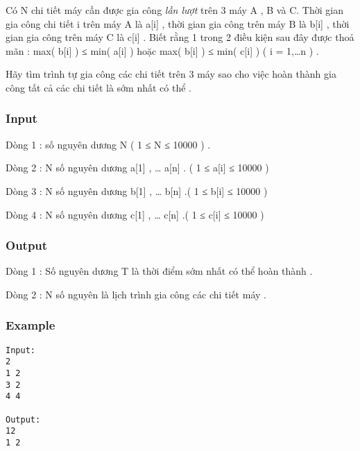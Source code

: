 



   Có N chi tiết máy cần được gia công   \textit{    lần lượt   }   trên 3 máy A , B và C. Thời gian gia công chi tiết i trên máy A là  a[i] , thời gian gia công trên máy B là b[i] , thời gian gia công trên máy C là c[i] . Biết rằng 1 trong 2 điều kiện sau đây được thoả mãn : max( b[i] ) ≤ min( a[i] ) hoặc max( b[i] ) ≤ min( c[i] ) ( i = 1,…n ) .   


   Hãy tìm trình tự gia công các chi tiết trên 3 máy sao cho việc hoàn thành gia công tất cả các chi tiết là sớm nhất có thể .  

\subsubsection{   Input  }

   Dòng 1 : số nguyên dương N ( 1 ≤ N ≤ 10000 ) .   


   Dòng 2 : N số nguyên dương a[1] , … a[n] . ( 1 ≤ a[i] ≤ 10000 )   


   Dòng 3 : N số nguyên dương b[1] , … b[n] .( 1 ≤ b[i] ≤ 10000 )   


   Dòng 4 : N số nguyên dương c[1] , … c[n] .( 1 ≤ c[i] ≤ 10000 )  

\subsubsection{   Output  }

   Dòng 1 : Số nguyên dương T là thời điểm sớm nhất có thể hoàn thành .   


   Dòng 2 : N số nguyên là lịch trình gia công các chi tiết máy .  

\subsubsection{   Example  }
\begin{verbatim}
Input:
2
1 2
3 2
4 4

Output:
12
1 2
\end{verbatim}
